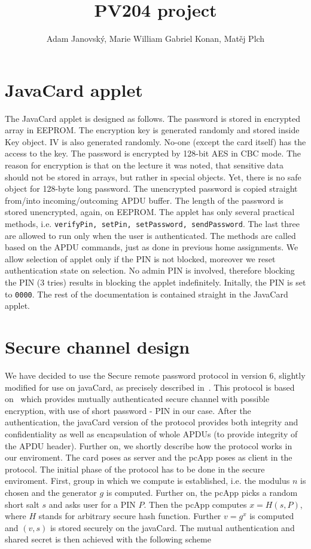 \documentclass[12pt,a4paper]{article}
\title{PV204 project}
\author{Adam Janovský, Marie William Gabriel Konan, Matěj Plch}
\date{}
\begin{document}
\maketitle
\section*{JavaCard applet}

The JavaCard applet is designed as follows. The password is stored in encrypted array in EEPROM. The encryption key is generated randomly and stored inside Key object. IV is also generated randomly. No-one (except the card itself) has the access to the key. The password is encrypted by 128-bit AES in CBC mode. The reason for encryption is that on the lecture it was noted, that sensitive data should not be stored in arrays, but rather in special objects. Yet, there is no safe object for 128-byte long password. The unencrypted password is copied straight from/into incoming/outcoming APDU buffer. The length of the password is stored unencrypted, again, on EEPROM. The applet has only several practical methods, i.e. \texttt{verifyPin, setPin, setPassword, sendPassword}. The last three are allowed to run only when the user is authenticated. The methods are called based on the APDU commands, just as done in previous home assignments. We allow selection of applet only if the PIN is not blocked, moreover we reset authentication state on selection. No admin PIN is involved, therefore blocking the PIN (3 tries) results in blocking the applet indefinitely. Initally, the PIN is set to \texttt{0000}. The rest of the documentation is contained straight in the JavaCard applet.

\section*{Secure channel design}

We have decided to use the Secure remote password protocol in version 6, slightly modified for use on javaCard, as precisely described in~\cite{srpjava}. This protocol is based on~\cite{srp} which provides mutually authenticated secure channel with possible encryption, with use of short password - PIN in our case. After the authentication, the javaCard version of the protocol provides both integrity and confidentiality as well as encapsulation of whole APDUs (to provide integrity of the APDU header). Further on, we shortly describe how the protocol works in our enviroment. The card poses as server and the pcApp poses as client in the protocol. The initial phase of the protocol has to be done in the secure enviroment. First, group in which we compute is established, i.e. the modulus $n$ is chosen and the generator $g$ is computed. Further on, the pcApp picks a random short salt $s$ and asks user for a PIN $P$. Then the pcApp computes $x = H(s,P)$, where $H$ stands for arbitrary secure hash function. Further $v = g^x$ is computed and $(v,s)$ is stored securely on the javaCard. The mutual authentication and shared secret is then achieved with the following scheme
\end{document}
